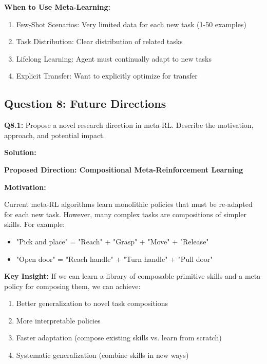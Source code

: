 \documentclass[12pt]{article}
\begin{document}
{{			\textbf{When to Use Meta-Learning:}
			\begin{enumerate}
				\item Few-Shot Scenarios: Very limited data for each new task (1-50 examples)
				\item Task Distribution: Clear distribution of related tasks
				\item Lifelong Learning: Agent must continually adapt to new tasks
				\item Explicit Transfer: Want to explicitly optimize for transfer
			\end{enumerate}
			
			\subsection{Question 8: Future Directions}
			
			\textbf{Q8.1:} Propose a novel research direction in meta-RL. Describe the motivation, approach, and potential impact.
			
			\textbf{Solution:}
			
			\textbf{Proposed Direction: Compositional Meta-Reinforcement Learning}
			
			\textbf{Motivation:}
			
			Current meta-RL algorithms learn monolithic policies that must be re-adapted for each new task. However, many complex tasks are compositions of simpler skills. For example:
			
			\begin{itemize}
				\item "Pick and place" = "Reach" + "Grasp" + "Move" + "Release"
				\item "Open door" = "Reach handle" + "Turn handle" + "Pull door"
			\end{itemize}
			
			\textbf{Key Insight:} If we can learn a library of composable primitive skills and a meta-policy for composing them, we can achieve:
			
			\begin{enumerate}
				\item Better generalization to novel task compositions
				\item More interpretable policies
				\item Faster adaptation (compose existing skills vs. learn from scratch)
				\item Systematic generalization (combine skills in new ways)
			\end{enumerate}
			
}}
\end{document}
